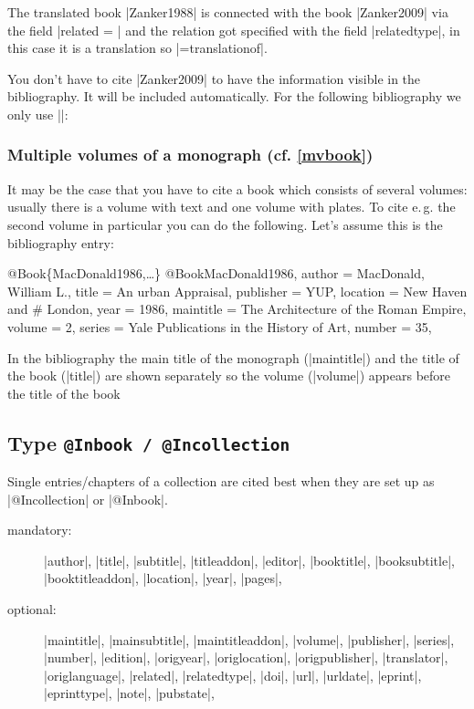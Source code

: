 \documentclass[a4paper,
10pt,
greek,
french,
spanish,
italian,
ngerman,
english
]{ltxdoc}
\begin{document}
The translated book |Zanker1988| is connected with the book |Zanker2009| via the field |related = | 
and the relation got specified with the field |relatedtype|, in this case it is a translation so |={translationof}|.

You don't have to cite |Zanker2009| to have the information visible in the bibliography. 
It will be included automatically. For the following bibliography we only use |\cite{Zanker1988}|:



\subsubsection{Multiple volumes of a monograph (cf. \cref{mvbook})}
It may be the case that you have to cite a book which consists of several volumes:
usually there is a volume with text and one volume with plates.
To cite  e.\,g. the second volume in particular you can do the following.
Let’s assume this is the bibliography entry:
\begin{bibexample}[label=MacDonald1986]{{@}Book\{MacDonald1986,…\}}
@Book{MacDonald1986,
  author    = {MacDonald, William L.},
  title     = {An urban Appraisal},
  publisher = YUP,    %
  location  = {New Haven and }# London, %
  year      = {1986},
  maintitle = {The Architecture of the Roman Empire},
  volume    = {2},
  series    = {Yale Publications in the History of Art},
  number    = {35},
}
\end{bibexample}
In the bibliography the main title of the monograph (|maintitle|)
and the title of the book (|title|) are shown separately  so the volume  (|volume|) 
appears before the title of the book


\subsection{Type \texttt{@Inbook / @Incollection}}\label{inbook}
Single entries/chapters of a collection are cited best when they are set up as  |@Incollection| or |@Inbook|.

\begin{description}
\item[mandatory:] 
|author|, |title|, |subtitle|, |titleaddon|,
|editor|,  |booktitle|, |booksubtitle|, |booktitleaddon|,
|location|, |year|, |pages|, 
\item[optional:]
|maintitle|, |mainsubtitle|, |maintitleaddon|, |volume|, 
|publisher|, |series|, |number|, |edition|, 
|origyear|, |origlocation|, |origpublisher|, 
|translator|, |origlanguage|,
|related|, |relatedtype|,
|doi|, |url|, |urldate|, |eprint|, |eprinttype|, |note|, |pubstate|, 
 \end{description}
 
\end{document}
